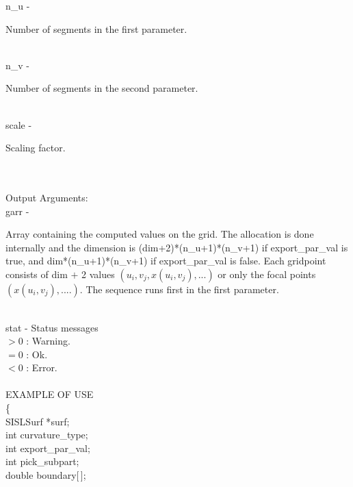         \>\>    {\fov n\_u}\> - \>  \begin{minipg2}
                     Number of segments in the first parameter.
                               \end{minipg2}\\[0.8ex]
        \>\>    {\fov n\_v}\> - \>  \begin{minipg2}
                     Number of segments in the second parameter.
                               \end{minipg2}\\[0.8ex]
        \>\>    {\fov scale}\> - \>  \begin{minipg2}
                     Scaling factor.
                               \end{minipg2}\\
\\
	\>Output Arguments:\\
        \>\>    {\fov garr}\> - \>  \begin{minipg2}
                     Array containing the computed values on the grid.
		     The allocation is done internally and the dimension 
		     is  (dim+2)*(n\_u+1)*(n\_v+1) if export\_par\_val is 
                     true, and dim*(n\_u+1)*(n\_v+1) if export\_par\_val is
                     false.
                     Each gridpoint consists of dim $+$ 2 values
                     $(u_i,v_j,x(u_i,v_j),...)$ or only the
                     focal points $(x(u_i,v_j),....)$.
		     The sequence runs first in the first parameter.
                              \end{minipg2}\\[0.8ex]
        \>\>    {\fov stat}     \> - \> Status messages\\
                \>\>\>\>   $> 0$  \> : Warning.\\
                \>\>\>\>   $= 0$  \> : Ok.\\
                \>\>\>\>   $< 0$  \> : Error.\\
\\
EXAMPLE OF USE\\
		\>      \{ \\
                \>\>    SISLSurf \> *{\fov surf};\\
                \>\>    int \> {\fov curvature\_type};\\
                \>\>    int \> {\fov export\_par\_val};\\
                \>\>    int \> {\fov pick\_subpart};\\
                \>\>    double \> {\fov boundary}[\,];\\
